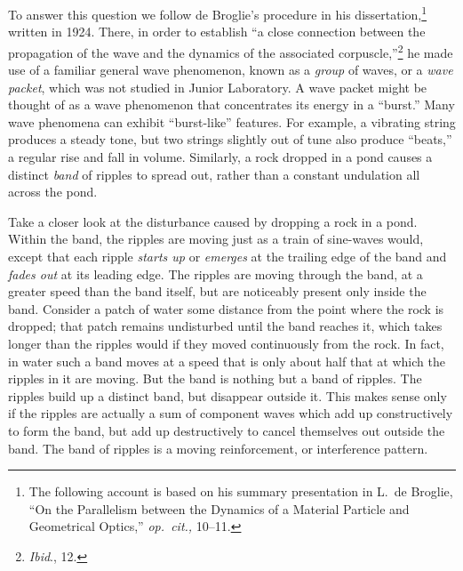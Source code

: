 To answer this question we follow de Broglie's procedure in his
dissertation,\footnote{The following account is based on his summary
  presentation in L.\ de Broglie, ``On the Parallelism between the
  Dynamics of a Material Particle and Geometrical Optics,'' \emph{op.\
  cit.,} 10--11.} written in 1924. There, in order to establish ``a close
connection between the propagation of the wave and the dynamics of the
associated corpuscle,''\footnote{\emph{Ibid}., 12.} he made use of a
familiar general wave phenomenon, known as a \emph{group} of waves, or a
\emph{wave packet}, which was not studied in Junior Laboratory. A wave
packet might be thought of as a wave phenomenon that concentrates its
energy in a ``burst.'' Many wave phenomena can exhibit ``burst-like''
features. For example, a vibrating string produces a steady tone, but
two strings slightly out of tune also produce ``beats,'' a regular rise
and fall in volume. Similarly, a rock dropped in a pond causes a
distinct \emph{band} of ripples to spread out, rather than a constant
undulation all across the pond.

Take a closer look at the disturbance caused by dropping a rock in a
pond. Within the band, the ripples are moving
just as a train of sine-waves would, except that each ripple
\emph{starts up} or \emph{emerges} at the trailing edge of the
band and \emph{fades out} at its leading edge. The ripples are moving
through the band, at a greater speed than the band itself, but are
noticeably present only inside the band. Consider a patch of water some
distance from the point where the rock is dropped; that patch remains
undisturbed until the band reaches it, which takes longer than the
ripples would if they moved continuously from the rock. In fact, in
water such a band moves at a speed that is only about half that at which
the ripples in it are moving. But the band is nothing but a band of
ripples. The ripples build up a distinct band, but disappear outside it.
This makes sense only if the ripples are actually a sum of component
waves which add up constructively to form the band, but add up
destructively to cancel themselves out outside the band. The band of
ripples is a moving reinforcement, or interference pattern.

